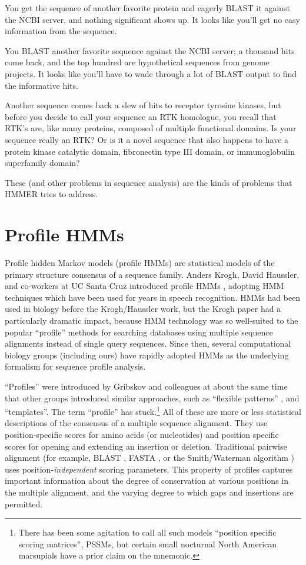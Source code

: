 \documentclass[11pt]{report}
\begin{document}
You get the sequence of another favorite protein and eagerly BLAST it
against the NCBI server, and nothing significant shows up. It looks
like you'll get no easy information from the sequence.

You BLAST another favorite sequence against the NCBI server; a
thousand hits come back, and the top hundred are hypothetical
sequences from genome projects. It looks like you'll have to wade
through a lot of BLAST output to find the informative hits.

Another sequence comes back a slew of hits to receptor tyrosine
kinases, but before you decide to call your sequence an RTK homologue,
you recall that RTK's are, like many proteins, composed of multiple
functional domains. Is your sequence really an RTK? Or is it a novel
sequence that also happens to have a protein kinase catalytic domain,
fibronectin type III domain, or immunoglobulin superfamily domain?

These (and other problems in sequence analysis) are the kinds of
problems that HMMER tries to address. 

\section {Profile HMMs}

Profile hidden Markov models (profile HMMs) are statistical models of
the primary structure consensus of a sequence family. Anders Krogh,
David Haussler, and co-workers at UC Santa Cruz introduced profile
HMMs \cite{Krogh94}, adopting HMM techniques which have been used for
years in speech recognition. HMMs had been used in biology before the
Krogh/Haussler work, but the Krogh paper had a particularly dramatic
impact, because HMM technology was so well-suited to the popular
``profile'' methods for searching databases using multiple sequence
alignments instead of single query sequences. Since then, several
computational biology groups (including ours) have rapidly adopted
HMMs as the underlying formalism for sequence profile analysis.

``Profiles'' were introduced by Gribskov and colleagues
\cite{Gribskov87,Gribskov90} at about the same time
that other groups introduced similar approaches, such as ``flexible
patterns'' \cite{Barton90}, and
``templates''\cite{Bashford87,Taylor86}. The term ``profile'' has
stuck.\footnote{There has been some agitation to call all such models
``position specific scoring matrices'', PSSMs, but certain small
nocturnal North American marsupials have a prior claim on the
mnemonic.}  All of these are more or less statistical descriptions of
the consensus of a multiple sequence alignment. They use
position-specific scores for amino acids (or nucleotides) and position
specific scores for opening and extending an insertion or deletion.
Traditional pairwise alignment (for example, BLAST
\cite{Altschul90}, FASTA \cite{Pearson88}, or the Smith/Waterman
algorithm \cite{Smith81}) uses position-{\em independent} scoring
parameters. This property of profiles captures important information
about the degree of conservation at various positions in the multiple
alignment, and the varying degree to which gaps and insertions are
permitted.
\end{document}
